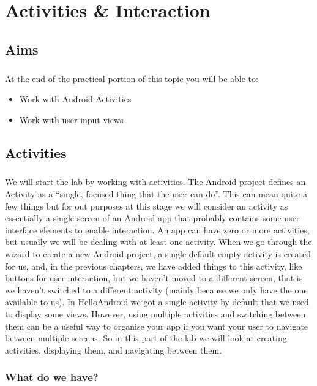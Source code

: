 \chapter{Activities \& Interaction}

\section{Aims}
\paragraph{} At the end of the practical portion of this topic you will be able to:

\begin{itemize}
\item Work with Android Activities
\item Work with user input views
\end{itemize}

\section{Activities}
\paragraph{} We will start the lab by working with activities. The Android project defines an Activity as a ``single, focused thing that the user can do''. This can mean quite a few things but for out purposes at this stage we will consider an activity as essentially a single screen of an Android app that probably contains some user interface elements to enable interaction. An app can have zero or more activities, but usually we will be dealing with at least one activity. When we go through the wizard to create a new Android project, a single default empty activity is created for us, and, in the previous chapters, we have added things to this activity, like buttons for user interaction, but we haven't moved to a different screen, that is we haven't switched to a different activity (mainly because we only have the one available to us). In HelloAndroid we got a single activity by default that we used to display some views. However, using multiple activities and switching between them can be a useful way to organise your app if you want your user to navigate between multiple screens. So in this part of the lab we will look at creating activities, displaying them, and navigating between them.

\subsection{What do we have?}
